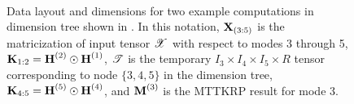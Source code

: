 \begin{figure}
 \\
\caption{Data layout and dimensions for two example computations in dimension tree shown in .  In this notation, $\Mz{X}{3:5}$ is the matricization of input tensor $\T{X}$ with respect to modes 3 through 5, $\M{K}_{1:2} = \Mn{H}{2} \Khat \Mn{H}{1}$, $\T T$ is the temporary $I_3 \times I_4 \times I_5 \times R$ tensor corresponding to node $\{3,4,5\}$ in the dimension tree, $\M{K}_{4:5} = \Mn{H}{5} \Khat \Mn{H}{4}$, and $\Mn{M}{3}$ is the MTTKRP result for mode 3.}
\label{fig:DTcartoon}
\end{figure}

